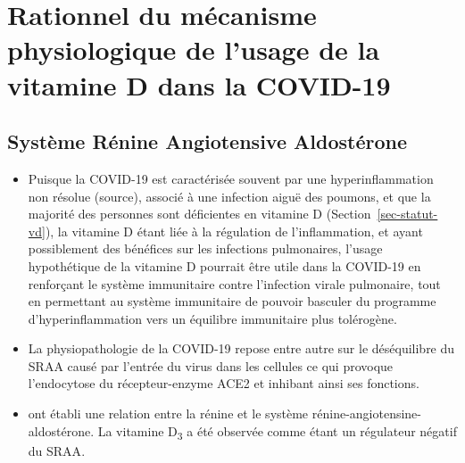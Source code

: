 \documentclass[
  a4paper,
  DIV=11,
  numbers=noendperiod,
  listof=totoc]{scrreprt}
\begin{document}
\section{Rationnel du mécanisme physiologique de l'usage de la vitamine
D dans la
COVID-19}\label{rationnel-du-muxe9canisme-physiologique-de-lusage-de-la-vitamine-d-dans-la-covid-19}

\subsection{Système Rénine Angiotensive
Aldostérone}\label{systuxe8me-ruxe9nine-angiotensive-aldostuxe9rone}

\begin{itemize}
\item
  Puisque la \ac{COVID-19} est caractérisée souvent par une
  hyperinflammation non résolue (source), associé à une infection aiguë
  des poumons, et que la majorité des personnes sont déficientes en
  vitamine D (Section~\ref{sec-statut-vd}), la vitamine D étant liée à
  la régulation de l'inflammation, et ayant possiblement des bénéfices
  sur les infections pulmonaires, l'usage hypothétique de la vitamine D
  pourrait être utile dans la \ac{COVID-19} en renforçant le système
  immunitaire contre l'infection virale pulmonaire, tout en permettant
  au système immunitaire de pouvoir basculer du programme
  d'hyperinflammation vers un équilibre immunitaire plus tolérogène.
\item
  La physiopathologie de la COVID-19 repose entre autre sur le
  déséquilibre du \ac{SRAA} causé par l'entrée du virus dans les
  cellules ce qui provoque l'endocytose du récepteur-enzyme ACE2 et
  inhibant ainsi ses fonctions.
\item
  \textcite{Li.2002} ont établi une relation entre la rénine et le
  système rénine-angiotensine-aldostérone. La vitamine
  D\textsubscript{3} a été observée comme étant un régulateur négatif du
  \ac{SRAA}.


\end{itemize}
\end{document}

